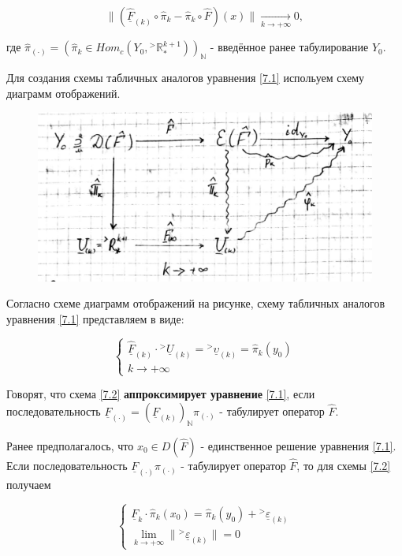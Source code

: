 \documentclass[__main__.tex]{subfiles}
\begin{document}
$$
\| \left(\underline{\hat{F}}_{\left(k\right)} \circ \hat{\pi}_k - \hat{\pi}_k \circ \hat{F}\right) \left(x\right) \| \xrightarrow[k\rightarrow + \infty]{} 0,
$$

где $\hat{\pi}_{\left(\cdot\right)} = \left(\hat{\pi}_k \in Hom_c\left(Y_0,{}^>\mathbb{R}^{k+1}_*\right)\right)_{\mathbb{N}}$ - введённое ранее табулирование $Y_0$.

Для создания схемы табличных аналогов уравнения \ref{7.1} испольуем схему диаграмм отображений.

\begin{figure}[h!]
	\centering
	\includegraphics[width=0.7\linewidth]{img/img_7_1}
	\caption{}
	\label{fig:img71}
\end{figure}

Согласно схеме диаграмм отображений на рисунке, схему табличных аналогов уравнения \ref{7.1} представляем в виде:

\begin{equation}\label{7.2}
\begin{cases}
\underline{\hat{F}}_{\left(k\right)} \cdot {}^> \underline{U}_{\left(k\right)} = {}^> \underline{\upsilon}_{\left(k\right)} = \hat{\pi}_k \left(y_0\right)\\
k\rightarrow+\infty
\end{cases}
\end{equation}

Говорят, что схема \ref{7.2} \textbf{аппроксимирует уравнение} \ref{7.1}, если последовательность $\underline{F}_{\left(\cdot\right)} = \left(\underline{F}_{\left(k\right)}\right)_{\mathbb{N}} \pi_{\left(\cdot\right)}$ - табулирует оператор $\hat{F}$.

Ранее предполагалось, что $x_0 \in D\left(\hat{F}\right)$ - единственное решение уравнения \ref{7.1}. Если последовательность $\underline{F}_{\left(\cdot\right)}\pi_{\left(\cdot\right)}$  - табулирует оператор $\hat{F}$, то для схемы \ref{7.2} получаем 

\begin{equation}
\begin{cases}
\underline{F}_k \cdot \hat{\pi}_k \left(x_0\right) = \hat{\pi}_k \left(y_0\right)+ {}^>\underline{\varepsilon}_{\left(k\right)} \\
\lim_{k\rightarrow + \infty} \| {}^>\underline{\varepsilon}_{\left(k\right)} \| = 0
\end{cases}
\end{equation}
\end{document}
